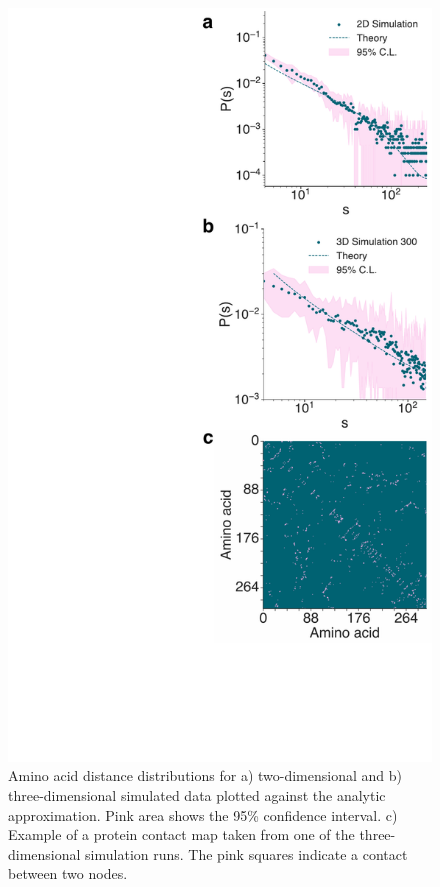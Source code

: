 \documentclass[
reprint,
twocolumn,
amsmath,amssymb,superscriptaddress,aps,
pre]{revtex4-1}
\begin{document}
 \begin{figure}[htb]
        \centering
	\includegraphics[width=\columnwidth]{paper/figures/Fig3/Fig3.pdf}
	    \caption{Amino acid distance distributions for a) two-dimensional and b) three-dimensional simulated data plotted against the analytic approximation. Pink area shows the 95\% confidence interval. c) Example of a protein contact map taken from one of the three-dimensional simulation runs. The pink squares indicate a contact between two nodes.}
        \label{fig:2d_sim}
\end{figure}
\end{document}
